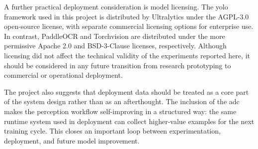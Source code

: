 A further practical deployment consideration is model licensing. The \gls{yolo}
framework used in this project is distributed by Ultralytics under the AGPL-3.0
open-source license, with separate commercial licensing options for enterprise
use. In contrast, PaddleOCR and Torchvision are distributed under the more
permissive Apache 2.0 and BSD-3-Clause licenses, respectively. Although
licensing did not affect the technical validity of the experiments reported
here, it should be considered in any future transition from research
prototyping to commercial or operational deployment.

The project also suggests that deployment data should be treated as a core part
of the system design rather than as an afterthought. The inclusion of the
\gls{adc} makes the perception workflow self-improving in a structured way: the
same runtime system used in deployment can collect higher-value examples for the
next training cycle. This closes an important loop between experimentation,
deployment, and future model improvement.

